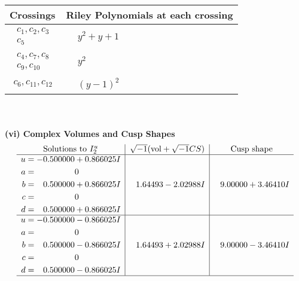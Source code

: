 \documentclass[1p]{elsarticle_modified}
\theoremstyle{definition}
\newcommand{\I}{\sqrt{-1}}
\begin{document}
\begin{tabular}{m{50pt}|m{274pt}}
Crossings & \hspace{64pt}Riley Polynomials at each crossing \\
\hline $$\begin{aligned}c_{1},c_{2},c_{3}\\c_{5}\end{aligned}$$&$\begin{aligned}
&y^2+y+1
\end{aligned}$\\
\hline $$\begin{aligned}c_{4},c_{7},c_{8}\\c_{9},c_{10}\end{aligned}$$&$\begin{aligned}
&y^2
\end{aligned}$\\
\hline $$\begin{aligned}c_{6},c_{11},c_{12}\end{aligned}$$&$\begin{aligned}
&(y-1)^2
\end{aligned}$\\
\hline
\end{tabular}\\~\\
\newpage\flushleft \textbf{(vi) Complex Volumes and Cusp Shapes}
$$\begin{array}{c|c|c}  
\text{Solutions to }I^u_{2}& \I (\text{vol} + \sqrt{-1}CS) & \text{Cusp shape}\\
 \hline 
\begin{aligned}
u &= -0.500000 + 0.866025 I \\
a &= \phantom{-0.000000 } 0 \\
b &= \phantom{-}0.500000 + 0.866025 I \\
c &= \phantom{-0.000000 } 0 \\
d &= \phantom{-}0.500000 + 0.866025 I\end{aligned}
 & \phantom{-}1.64493 - 2.02988 I & \phantom{-}9.00000 + 3.46410 I \\ \hline\begin{aligned}
u &= -0.500000 - 0.866025 I \\
a &= \phantom{-0.000000 } 0 \\
b &= \phantom{-}0.500000 - 0.866025 I \\
c &= \phantom{-0.000000 } 0 \\
d &= \phantom{-}0.500000 - 0.866025 I\end{aligned}
 & \phantom{-}1.64493 + 2.02988 I & \phantom{-}9.00000 - 3.46410 I\\
 \hline 
 \end{array}$$\newpage\newpage\renewcommand{\arraystretch}{1}
\end{document}
